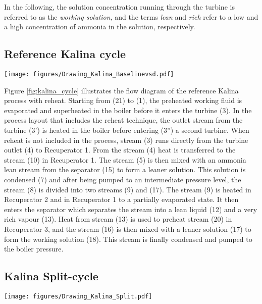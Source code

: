 \documentclass[review,3p]{elsarticle}
\begin{document}
In the following, the solution concentration running through the turbine is referred to as the \emph{working solution}, and the terms \emph{lean} and \emph{rich} refer to a low and a high concentration of ammonia in the solution, respectively.

\subsection{Reference Kalina cycle}
\label{sec:kalina_cycle}
\begin{figure*}[htbp]
\centering
\texttt{[image: figures/Drawing\_Kalina\_Baselinevsd.pdf]}
\caption{Sketch of the Kalina reference process with reheat}
\label{fig:kalina_cycle}
\end{figure*}

Figure \ref{fig:kalina_cycle} illustrates the flow diagram of the reference Kalina process with reheat. Starting from (21) to (1), the preheated working fluid is evaporated and superheated in the boiler before it enters the turbine (3). In the process layout that includes the reheat technique, the outlet stream from the turbine (3') is heated in the boiler before entering (3'') a second turbine. When reheat is not included in the process, stream (3) runs directly from the turbine outlet (4) to Recuperator 1. From the stream (4) heat is transferred to the stream (10) in Recuperator 1. The stream (5) is then mixed with an ammonia lean stream from the separator (15) to form a leaner solution. This solution is condensed (7) and after being pumped to an intermediate pressure level, the stream (8) is divided into two streams (9) and (17). The stream (9) is heated in Recuperator 2 and in Recuperator 1 to a partially evaporated state. It then enters the separator which separates the stream into a lean liquid (12) and a very rich vapour (13). Heat from stream (13) is used to preheat stream (20) in Recuperator 3, and the stream (16) is then mixed with a leaner solution (17) to form the working solution (18). This stream is finally condensed and pumped to the boiler pressure. 





\subsection{Kalina Split-cycle}
\label{sec:split_cycle}
\begin{figure*}[htbp]
\centering
\texttt{[image: figures/Drawing\_Kalina\_Split.pdf]}
\caption{Sketch of the Kalina Split-cycle process}
\label{fig:split_cycle}
\end{figure*}
\end{document}
